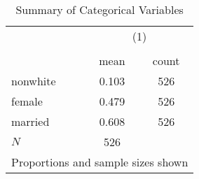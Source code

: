 \begin{table}[htbp]\centering
\def\sym#1{\ifmmode^{#1}\else\(^{#1}\)\fi}
\caption{Summary of Categorical Variables}\label{tab:0201-categorical_summary}
\begin{tabular}{l*{1}{cc}}
\toprule
            &\multicolumn{2}{c}{(1)}  \\
            &\multicolumn{2}{c}{}     \\
            &        mean&       count\\
\midrule
nonwhite    &       0.103&         526\\
female      &       0.479&         526\\
married     &       0.608&         526\\
\midrule
\(N\)       &         526&            \\
\bottomrule
\multicolumn{3}{l}{\footnotesize Proportions and sample sizes shown}\\
\end{tabular}
\end{table}
